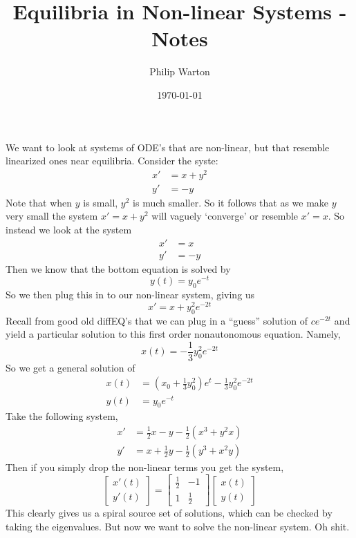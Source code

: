 \documentclass{article}
\theoremstyle{definition}
\begin{document}
\title{Equilibria in Non-linear Systems - Notes}
\author{Philip Warton}
\date{\today}
\maketitle
We want to look at systems of ODE's that are non-linear, but that resemble linearized ones near equilibria.
Consider the syste:
\begin{align*}
    x' &= x + y^2 \\
    y' &= -y
\end{align*}
Note that when $y$ is small, $y^2$ is much smaller. So it follows that as we make $y$ very
small the system $x' = x + y^2$ will vaguely `converge' or resemble $x' = x$. So instead we
look at the system 
\begin{align*}
    x' &= x \\
    y' &= -y
\end{align*}
Then we know that the bottom equation is solved by 
\[
    y(t) = y_0 e^{-t}
\]
So we then plug this in to our non-linear system, giving us
\[
    x' = x + y_0^2 e^{-2t}
\]
Recall from good old diffEQ's that we can plug in a ``guess'' solution of $ce^{-2t}$
and yield a particular solution to this first order nonautonomous equation. Namely,
\[
    x(t) = -\frac{1}{3}y_0^2e^{-2t}
\]
So we get a general solution of
\begin{align*}
    x(t) & = \left(x_0 + \frac{1}{3}y_0^2 \right)e^t - \frac{1}{3}y_0^2 e^{-2t}\\
    y(t) & = y_0 e^{-t}
\end{align*}
Take the following system,
\begin{align*}
    x' &= \frac{1}{2}x - y - \frac{1}{2}(x^3 + y^2 x) \\
    y' &= x + \frac{1}{2}y - \frac{1}{2}(y^3 + x^2 y)
\end{align*}
Then if you simply drop the non-linear terms you get the system,
\[
    \begin{bmatrix}
        x'(t)\\y'(t)
    \end{bmatrix} =
    \begin{bmatrix}
        \frac{1}{2}&-1\\1&\frac{1}{2}
    \end{bmatrix}
   \begin{bmatrix}
        x(t)\\y(t)
    \end{bmatrix}
\]
This clearly gives us a spiral source set of solutions, which can be checked by taking
the eigenvalues. But now we want to solve the non-linear system. Oh shit.
\end{document}
